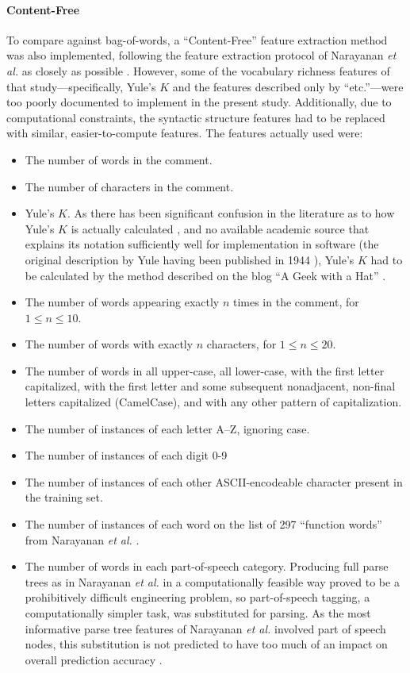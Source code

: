 \documentclass[12pt]{article}
\begin{document}
\paragraph{Content-Free}
To compare against bag-of-words, a ``Content-Free'' feature extraction method was also implemented, following the feature extraction protocol of Narayanan \textit{et al.} as closely as possible \cite{narayanan2012feasibility}. However, some of the vocabulary richness features of that study---specifically, Yule's $K$ and the features described only by ``etc.''---were too poorly documented to implement in the present study. Additionally, due to computational constraints, the syntactic structure features had to be replaced with similar, easier-to-compute features. The features actually used were:
\begin{itemize}
    \item The number of words in the comment.
    \item The number of characters in the comment.
    \item Yule's $K$. As there has been significant confusion in the literature as to how Yule's $K$ is actually calculated \cite{miranda2005yule}, and no available academic source that explains its notation sufficiently well for implementation in software (the original description by Yule having been published in 1944 \cite{yule1944statistical}), Yule's $K$ had to be calculated by the method described on the blog ``A Geek with a Hat'' \cite{teller2011measuring}.
    \item The number of words appearing exactly $n$ times in the comment, for $1 \le n \le 10$.
    \item The number of words with exactly $n$ characters, for $1 \le n \le 20$.
    \item The number of words in all upper-case, all lower-case, with the first letter capitalized, with the first letter and some subsequent nonadjacent, non-final letters capitalized (CamelCase), and with any other pattern of capitalization.
    \item The number of instances of each letter A--Z, ignoring case.
    \item The number of instances of each digit 0-9
    \item The number of instances of each other ASCII-encodeable character present in the training set.
    \item The number of instances of each word on the list of 297 ``function words'' from Narayanan \textit{et al.} \cite{narayanan2012feasibility}.
    \item The number of words in each part-of-speech category. Producing full parse trees as in Narayanan \textit{et al.} in a computationally feasible way proved to be a prohibitively difficult engineering problem, so part-of-speech tagging, a computationally simpler task, was substituted for parsing. As the most informative parse tree features of Narayanan \textit{et al.} involved part of speech nodes, this substitution is not predicted to have too much of an impact on overall prediction accuracy \cite{narayanan2012feasibility}.
    
\end{itemize}
\end{document}

